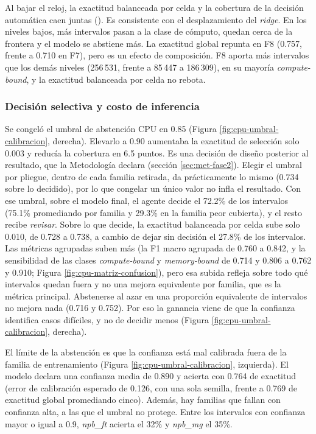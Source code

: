 Al bajar el reloj, la exactitud balanceada por celda y la cobertura de la decisión automática caen juntas (). Es consistente con el desplazamiento del \textit{ridge}. En los niveles bajos, más intervalos pasan a la clase de cómputo, quedan cerca de la frontera y el modelo se abstiene más. La exactitud global repunta en F8 (0.757, frente a 0.710 en F7), pero es un efecto de composición. F8 aporta más intervalos que los demás niveles (256\,531, frente a 85\,447 a 186\,309), en su mayoría \textit{compute-bound}, y la exactitud balanceada por celda no rebota.

\subsubsection{Decisión selectiva y costo de inferencia}
\label{sec:resultados-cpu-selectiva}

Se congeló el umbral de abstención CPU en 0.85 (Figura \ref{fig:cpu-umbral-calibracion}, derecha). Elevarlo a 0.90 aumentaba la exactitud de selección solo 0.003 y reducía la cobertura en 6.5 puntos. Es una decisión de diseño posterior al resultado, que la Metodología declara (sección \ref{sec:met-fase2}). Elegir el umbral por pliegue, dentro de cada familia retirada, da prácticamente lo mismo (0.734 sobre lo decidido), por lo que congelar un único valor no infla el resultado. Con ese umbral, sobre el modelo final, el agente decide el 72.2\% de los intervalos (75.1\% promediando por familia y 29.3\% en la familia peor cubierta), y el resto recibe \textit{revisar}. Sobre lo que decide, la exactitud balanceada por celda sube solo 0.010, de 0.728 a 0.738, a cambio de dejar sin decisión el 27.8\% de los intervalos. Las métricas agrupadas suben más (la F1 macro agrupada de 0.760 a 0.842, y la sensibilidad de las clases \textit{compute-bound} y \textit{memory-bound} de 0.714 y 0.806 a 0.762 y 0.910; Figura \ref{fig:cpu-matriz-confusion}), pero esa subida refleja sobre todo qué intervalos quedan fuera y no una mejora equivalente por familia, que es la métrica principal. Abstenerse al azar en una proporción equivalente de intervalos no mejora nada (0.716 y 0.752). Por eso la ganancia viene de que la confianza identifica casos difíciles, y no de decidir menos (Figura \ref{fig:cpu-umbral-calibracion}, derecha).

El límite de la abstención es que la confianza está mal calibrada fuera de la familia de entrenamiento (Figura \ref{fig:cpu-umbral-calibracion}, izquierda). El modelo declara una confianza media de 0.890 y acierta con 0.764 de exactitud (error de calibración esperado de 0.126, con una sola semilla, frente a 0.769 de exactitud global promediando cinco). Además, hay familias que fallan con confianza alta, a las que el umbral no protege. Entre los intervalos con confianza mayor o igual a 0.9, \textit{npb\_ft} acierta el 32\% y \textit{npb\_mg} el 35\%.


